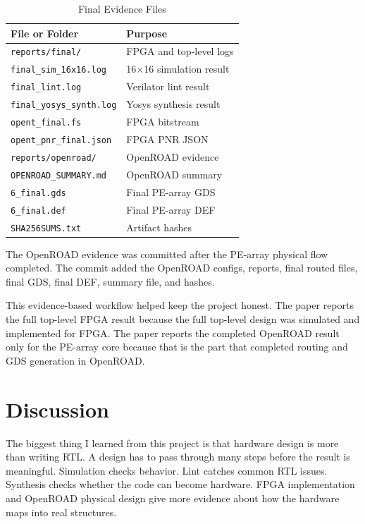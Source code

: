 \documentclass[conference]{IEEEtran}
\begin{document}
\begin{table}[h]
\centering
\caption{Final Evidence Files}
\label{tab:evidence}
\begin{tabular}{ll}
\toprule
File or Folder & Purpose \\
\midrule
\texttt{reports/final/} & FPGA and top-level logs \\
\texttt{final\_sim\_16x16.log} & 16$\times$16 simulation result \\
\texttt{final\_lint.log} & Verilator lint result \\
\texttt{final\_yosys\_synth.log} & Yosys synthesis result \\
\texttt{opent\_final.fs} & FPGA bitstream \\
\texttt{opent\_pnr\_final.json} & FPGA PNR JSON \\
\texttt{reports/openroad/} & OpenROAD evidence \\
\texttt{OPENROAD\_SUMMARY.md} & OpenROAD summary \\
\texttt{6\_final.gds} & Final PE-array GDS \\
\texttt{6\_final.def} & Final PE-array DEF \\
\texttt{SHA256SUMS.txt} & Artifact hashes \\
\bottomrule
\end{tabular}
\end{table}

The OpenROAD evidence was committed after the PE-array physical flow completed. The commit added the OpenROAD configs, reports, final routed files, final GDS, final DEF, summary file, and hashes.

This evidence-based workflow helped keep the project honest. The paper reports the full top-level FPGA result because the full top-level design was simulated and implemented for FPGA. The paper reports the completed OpenROAD result only for the PE-array core because that is the part that completed routing and GDS generation in OpenROAD.

\section{Discussion}

The biggest thing I learned from this project is that hardware design is more than writing RTL. A design has to pass through many steps before the result is meaningful. Simulation checks behavior. Lint catches common RTL issues. Synthesis checks whether the code can become hardware. FPGA implementation and OpenROAD physical design give more evidence about how the hardware maps into real structures.
\end{document}
